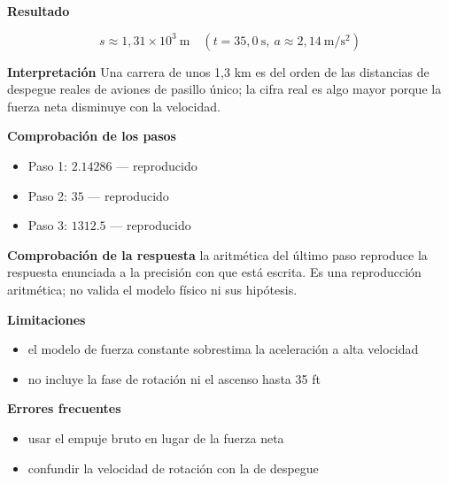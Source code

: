 \documentclass[10pt,openany]{book}
\begin{document}
\begin{tcolorbox}[title={Problema resuelto}, studiumworked, breakable]
\noindent\textbf{Resultado}

\[
s \approx 1{,}31\times 10^{3}\ \mathrm{m}\quad (t = 35{,}0\ \mathrm{s},\ a \approx 2{,}14\ \mathrm{m/s^{2}})
\]

\noindent\textbf{Interpretación}
Una carrera de unos 1,3 km es del orden de las distancias de despegue reales de aviones de pasillo único; la cifra real es algo mayor porque la fuerza neta disminuye con la velocidad.

\noindent\textbf{Comprobación de los pasos}
\begin{itemize}
\item Paso 1: $2.14286$ — reproducido
\item Paso 2: $35$ — reproducido
\item Paso 3: $1312.5$ — reproducido
\end{itemize}

\noindent\textbf{Comprobación de la respuesta} la aritmética del último paso reproduce la respuesta enunciada a la precisión con que está escrita. Es una reproducción aritmética; no valida el modelo físico ni sus hipótesis.

\noindent\textbf{Limitaciones}
\begin{itemize}
\item el modelo de fuerza constante sobrestima la aceleración a alta velocidad
\item no incluye la fase de rotación ni el ascenso hasta 35 ft
\end{itemize}

\noindent\textbf{Errores frecuentes}
\begin{itemize}
\item usar el empuje bruto en lugar de la fuerza neta
\item confundir la velocidad de rotación con la de despegue
\end{itemize}
\end{tcolorbox}
\end{document}
